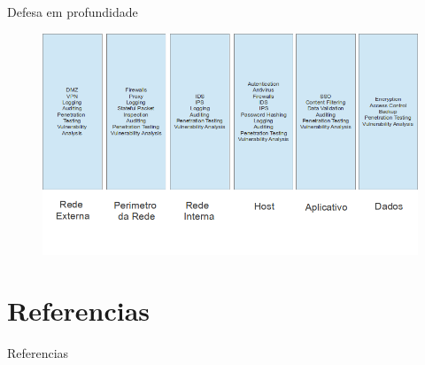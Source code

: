 \documentclass{beamer}
\begin{document}
\begin{frame}{Defesa em profundidade}
\begin{figure}[tbph]
\centering
\includegraphics[width=0.9\linewidth]{./capasimp.png}
\label{fig:capasimp}
\end{figure}
\end{frame}

\section{Referencias}
\begin{frame}[allowframebreaks]{Referencias}
    
    
\end{frame}
\end{document}
